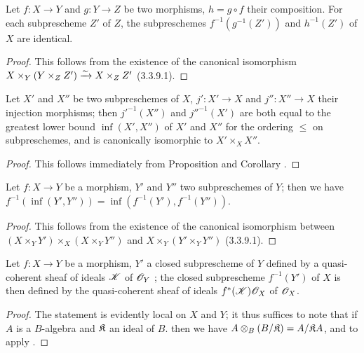 \begin{cor}[4.4.2]
\label{1.4.4.2}
Let $f:X\to Y$ and $g:Y\to Z$ be two morphisms, $h=g\circ f$ their composition.
For each subprescheme $Z'$ of $Z$, the subpreschemes $f^{-1}(g^{-1}(Z'))$ and $h^{-1}(Z')$ of $X$ are identical.
\end{cor}

\begin{proof}
\label{proof-1.4.4.2}
This follows from the existence of the canonical isomorphism $X\times_Y(Y\times_Z Z')\xrightarrow{\sim} X\times_Z Z'$ (3.3.9.1).
\end{proof}

\begin{cor}[4.4.3]
\label{1.4.4.3}
Let $X'$ and $X''$ be two subpreschemes of $X$, $j':X'\to X$ and $j'':X''\to X$ their injection morphisms; then ${j'}^{-1}(X'')$ and ${j''}^{-1}(X')$ are both equal to the greatest lower bound $\inf(X',X'')$ of $X'$ and $X''$ for the ordering $\leqslant$ on subpreschemes, and is canonically isomorphic to $X'\times_X X''$.
\end{cor}

\begin{proof}
\label{proof-1.4.4.3}
This follows immediately from Proposition  and Corollary .
\end{proof}

\begin{cor}[4.4.4]
\label{1.4.4.4}
Let $f:X\to Y$ be a morphism, $Y'$ and $Y''$ two subpreschemes of $Y$; then we have $f^{-1}(\inf(Y',Y''))=\inf(f^{-1}(Y'),f^{-1}(Y''))$.
\end{cor}

\begin{proof}
\label{proof-1.4.4.4}
This follows from the existence of the canonical isomorphism between $(X\times_Y Y')\times_X(X\times_Y Y'')$ and $X\times_Y(Y'\times_Y Y'')$ (3.3.9.1).
\end{proof}

\begin{prop}[4.4.5]
\label{1.4.4.5}
Let $f:X\to Y$ be a morphism, $Y'$ a closed subprescheme of $Y$ defined by a quasi-coherent sheaf of ideals $\mathscr{K}$ of $\mathscr{O}_Y$ ; the closed subprescheme $f^{-1}(Y')$ of $X$ is then defined by the quasi-coherent sheaf of ideals $f^*(\mathscr{K})\mathscr{O}_X$ of $\mathscr{O}_X$.
\end{prop}

\begin{proof}
\label{proof-1.4.4.5}
The statement is evidently local on $X$ and $Y$; it thus suffices to note that if $A$ is a $B$-algebra and $\mathfrak{K}$ an ideal of $B$. then we have $A\otimes_B(B/\mathfrak{K})=A/\mathfrak{K}A$, and to apply .
\end{proof}

